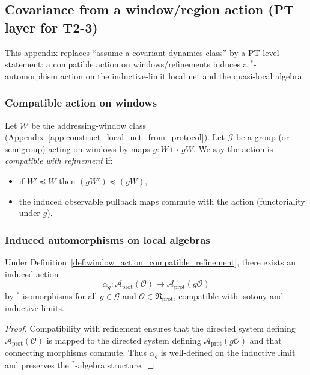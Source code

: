 \subsection{Covariance from a window/region action (PT layer for T2-3)}
\label{app:covariance_from_window_action}

\AuditTag This appendix replaces ``assume a covariant dynamics class'' by a PT-level statement: a compatible action on windows/refinements induces a $^\ast$-automorphism action on the inductive-limit local net and the quasi-local algebra.

\subsubsection{Compatible action on windows}
\begin{definition}
\label{def:window_action_compatible_refinement}
\MathTag Let $\mathcal{W}$ be the addressing-window class (Appendix~\ref{app:construct_local_net_from_protocol}).
Let $\mathcal{G}$ be a group (or semigroup) acting on windows by maps $g:W\mapsto gW$.
We say the action is \emph{compatible with refinement} if:
\begin{itemize}
\item if $W'\preceq W$ then $(gW')\preceq (gW)$,
\item the induced observable pullback maps commute with the action (functoriality under $g$).
\end{itemize}
\end{definition}

\subsubsection{Induced automorphisms on local algebras}
\begin{proposition}
\label{prop:induced_action_on_prot_net}
\MathTag Under Definition~\ref{def:window_action_compatible_refinement}, there exists an induced action
\[
\alpha_g:\mathcal{A}_{\mathrm{prot}}(\mathcal{O})\to \mathcal{A}_{\mathrm{prot}}(g\mathcal{O})
\]
by $^\ast$-isomorphisms for all $g\in\mathcal{G}$ and $\mathcal{O}\in\mathfrak{R}_{\mathrm{prot}}$, compatible with isotony and inductive limits.
\end{proposition}
\begin{proof}
Compatibility with refinement ensures that the directed system defining $\mathcal{A}_{\mathrm{prot}}(\mathcal{O})$ is mapped to the directed system defining $\mathcal{A}_{\mathrm{prot}}(g\mathcal{O})$ and that connecting morphisms commute.
Thus $\alpha_g$ is well-defined on the inductive limit and preserves the $^\ast$-algebra structure.
\end{proof}

